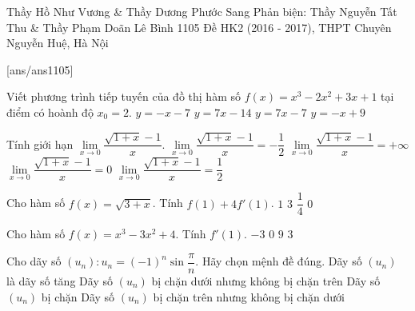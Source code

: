 \begin{name}
{Thầy Hồ Như Vương  \&  Thầy Dương Phước Sang 
	\newline Phản biện: Thầy Nguyễn Tất Thu \& Thầy Phạm Doãn Lê Bình}
{1105 Đề HK2 (2016 - 2017), THPT Chuyên Nguyễn Huệ, Hà Nội}
\end{name}
\setcounter{ex}{0}\setcounter{bt}{0}
[ans/ans1105]

\begin{ex}%
	Viết phương trình tiếp tuyến của đồ thị hàm số $f(x)=x^3-2x^2+3x+1$ tại điểm có hoành độ $x_0=2$.
	\choice
	{$y=-x-7$}
	{$y=7x-14$}
	{\True $y=7x-7$}
	{$y=-x+9$}
\end{ex}
\begin{ex}%
	Tính giới hạn $\lim\limits_{x\to 0} \dfrac{\sqrt{1+x}-1}{x}$.
	\choice
	{$\lim\limits_{x\to 0} \dfrac{\sqrt{1+x}-1}{x}=-\dfrac{1}{2}$}
	{$\lim\limits_{x\to 0} \dfrac{\sqrt{1+x}-1}{x}=+\infty $}
	{$\lim\limits_{x\to 0} \dfrac{\sqrt{1+x}-1}{x}=0$}
	{\True $\lim\limits_{x\to 0} \dfrac{\sqrt{1+x}-1}{x}=\dfrac{1}{2}$}
\end{ex}
\begin{ex}%
	Cho hàm số $f(x)=\sqrt{3+x}$. Tính $f(1)+4f'(1)$.
	\choice
	{$1$}
	{\True $3$}
	{$\dfrac{1}{4}$}
	{$0$}
\end{ex}
\begin{ex}%
	Cho hàm số $f(x)=x^3-3x^2+4$. Tính $f'(1)$.
	\choice
	{\True $-3$}
	{$0$}
	{$9$}
	{$3$}
\end{ex}
\begin{ex}%
	Cho dãy số $(u_n): u_n=(-1)^n\sin \dfrac{\pi}{n}$. Hãy chọn mệnh đề đúng.
	\choice
	{Dãy số $(u_n)$ là dãy số tăng}
	{Dãy số $(u_n)$ bị chặn dưới nhưng không bị chặn trên}
	{\True Dãy số $(u_n)$ bị chặn}
	{Dãy số $(u_n)$ bị chặn trên nhưng không bị chặn dưới}
\end{ex}
